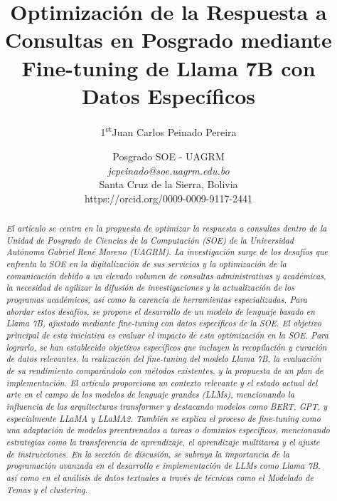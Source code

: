 \documentclass[12pt,twocolumn]{article}
\title{\Huge Optimización de la Respuesta a Consultas en Posgrado mediante Fine-tuning de Llama 7B con Datos Específicos \\}
\author{\Large {1\textsuperscript{st}Juan Carlos Peinado Pereira}}
\date{\normalsize Posgrado SOE - UAGRM\\
\textit{jcpeinado@soe.uagrm.edu.bo}\\
Santa Cruz de la Sierra, Bolivia \\
https://orcid.org/0009-0009-9117-2441}
\begin{document}
\maketitle
\titlespacing*{\section}{0pt}{0cm}{0cm}
\titlespacing*{\subsection}{0pt}{0cm}{0cm}

\begin{abstract}
    \textit{\normalsize El artículo se centra en la propuesta de optimizar la respuesta a consultas dentro de la Unidad de Posgrado de Ciencias de la Computación (SOE) de la Universidad Autónoma Gabriel René Moreno (UAGRM). 
La investigación surge de los desafíos que enfrenta la SOE en la digitalización de sus servicios y la optimización de la comunicación debido a un elevado volumen de consultas administrativas y académicas, la necesidad de agilizar la difusión de investigaciones y la actualización de los programas académicos, así como la carencia de herramientas especializadas.
Para abordar estos desafíos, se propone el desarrollo de un modelo de lenguaje basado en Llama 7B, ajustado mediante fine-tuning con datos específicos de la SOE. 
El objetivo principal de esta iniciativa es evaluar el impacto de esta optimización en la SOE. 
Para lograrlo, se han establecido objetivos específicos que incluyen la recopilación y curación de datos relevantes, la realización del fine-tuning del modelo Llama 7B, la evaluación de su rendimiento comparándolo con métodos existentes, y la propuesta de un plan de implementación.
El artículo proporciona un contexto relevante y el estado actual del arte en el campo de los modelos de lenguaje grandes (LLMs), mencionando la influencia de las arquitecturas transformer y destacando modelos como BERT, GPT, y especialmente LLaMA y LLaMA2. 
También se explica el proceso de fine-tuning como una adaptación de modelos preentrenados a tareas o dominios específicos, mencionando estrategias como la transferencia de aprendizaje, el aprendizaje multitarea y el ajuste de instrucciones.
En la sección de discusión, se subraya la importancia de la programación avanzada en el desarrollo e implementación de LLMs como Llama 7B, así como en el análisis de datos textuales a través de técnicas como el Modelado de Temas y el clustering. 
}
\end{abstract}
\end{document}
